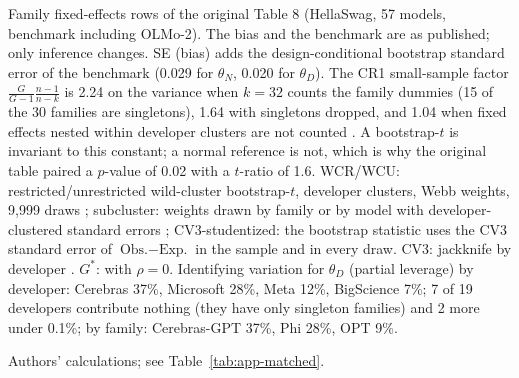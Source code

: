\begin{table}[tp]
\begin{tablenotes}
Family fixed-effects rows of the original Table 8 (HellaSwag, 57 models, benchmark including OLMo-2). The bias and the benchmark are as published; only inference changes. SE (bias) adds the design-conditional bootstrap standard error of the benchmark (0.029 for $\theta_N$, 0.020 for $\theta_D$). The CR1 small-sample factor $\frac{G}{G-1}\frac{n-1}{n-k}$ is 2.24 on the variance when $k=32$ counts the family dummies (15 of the 30 families are singletons), 1.64 with singletons dropped, and 1.04 when fixed effects nested within developer clusters are not counted \citep{cameron2015practitioner}. A bootstrap-$t$ is invariant to this constant; a normal reference is not, which is why the original table paired a $p$-value of 0.02 with a $t$-ratio of 1.6. WCR/WCU: restricted/unrestricted wild-cluster bootstrap-$t$, developer clusters, Webb weights, 9,999 draws \citep{cameron2008bootstrap,webb2023reworking}; subcluster: weights drawn by family or by model with developer-clustered standard errors \citep{mackinnon2018wild}; CV3-studentized: the bootstrap statistic uses the CV3 standard error of $\text{Obs.}-\text{Exp.}$ in the sample and in every draw. CV3: jackknife by developer \citep{mackinnon2023cluster}. $G^*$: \citet{carter2017asymptotic} with $\rho=0$. Identifying variation for $\theta_D$ (partial leverage) by developer: Cerebras 37\%, Microsoft 28\%, Meta 12\%, BigScience 7\%; 7 of 19 developers contribute nothing (they have only singleton families) and 2 more under 0.1\%; by family: Cerebras-GPT 37\%, Phi 28\%, OPT 9\%.
\end{tablenotes}
\begin{tablenotes}[Source]
Authors' calculations; see Table~\ref{tab:app-matched}.
\end{tablenotes}
\end{table}
